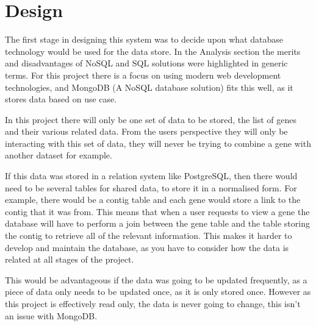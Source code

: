 \section{Design}
% 
% 
% 

The first stage in designing this system was to decide upon what database technology would be used for the data store. In the Analysis section the merits and disadvantages of NoSQL and SQL solutions were highlighted in generic terms. For this project there is a focus on using modern web development technologies, and MongoDB (A NoSQL database solution) fits this well, as it stores data based on use case. 

In this project there will only be one set of data to be stored, the list of genes and their various related data. From the users perspective they will only be interacting with this set of data, they will never be trying to combine a gene with another dataset for example. 

If this data was stored in a relation system like PostgreSQL, then there would need to be several tables for shared data, to store it in a normalised form. For example, there would be a contig table and each gene would store a link to the contig that it was from. This means that when a user requests to view a gene the database will have to perform a join between the gene table and the table storing the contig to retrieve all of the relevant information. This makes it harder to develop and maintain the database, as you have to consider how the data is related at all stages of the project. 

This would be advantageous if the data was going to be updated frequently, as a piece of data only needs to be updated once, as it is only stored once. However as this project is effectively read only, the data is never going to change, this isn't an issue with MongoDB.

